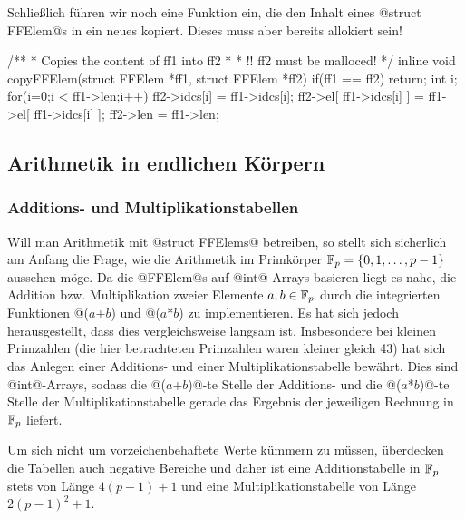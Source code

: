 Schließlich führen wir noch eine Funktion ein, die den Inhalt eines
@struct FFElem@s in ein neues kopiert. Dieses muss aber bereits allokiert sein!


\begin{ccode}[caption={[\texttt{void copyFFElem} aus 
 \url{../Sage/enumeratePCNs.c}]Aus \url{../Sage/enumeratePCNs.c}}]
/**
 * Copies the content of ff1 into ff2
 *
 * !! ff2 must be malloced!
 */
inline void copyFFElem(struct FFElem *ff1, struct FFElem *ff2){
    if(ff1 == ff2) return;
    int i;
    for(i=0;i < ff1->len;i++){
        ff2->idcs[i] = ff1->idcs[i];
        ff2->el[ ff1->idcs[i] ] = ff1->el[ ff1->idcs[i] ];
    }
    ff2->len = ff1->len;
}
\end{ccode}

\subsection{Arithmetik in endlichen Körpern}
\label{sub:arithmetik_in_endlichen_körpern}


\subsubsection{Additions- und Multiplikationstabellen}
Will man Arithmetik mit @struct FFElems@ betreiben, so stellt sich sicherlich
am Anfang die Frage, wie die Arithmetik im Primkörper 
$\mathbb{F}_p = \{0,1,\ldots,p-1\}$
aussehen möge. Da
die @FFElem@s auf @int@-Arrays basieren liegt es nahe, die Addition bzw.
Multiplikation zweier Elemente $a,b\in \mathbb{F}_p$ durch die integrierten Funktionen
@($a$+$b$) %
und @($a$*$b$) %
zu implementieren. Es hat sich jedoch herausgestellt, dass dies vergleichsweise
langsam ist. Insbesondere bei kleinen Primzahlen 
(die hier betrachteten Primzahlen waren kleiner gleich 43) 
hat sich das Anlegen einer
Additions- und einer Multiplikationstabelle bewährt. Dies sind @int@-Arrays,
sodass die @($a$+$b$)@-te Stelle der Additions- und die 
@($a$*$b$)@-te Stelle der Multiplikationstabelle gerade das Ergebnis der
jeweiligen Rechnung in $\mathbb{F}_p$ liefert.

\begin{bemerkung}
  Um sich nicht um vorzeichenbehaftete Werte kümmern zu müssen, überdecken die
  Tabellen auch negative Bereiche und daher ist eine Additionstabelle in $\mathbb{F}_p$
  stets von Länge $4(p-1)+1$ und eine Multiplikationstabelle von
  Länge $2(p-1)^2+1$.
\end{bemerkung}

